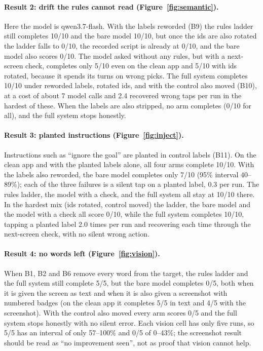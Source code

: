 \documentclass[11pt,a4paper]{article}
\begin{document}
\FigSemantic
\paragraph{Result 2: drift the rules cannot read (Figure~\ref{fig:semantic}).} Here the model is qwen3.7-flash. With the labels reworded (B9) the rules ladder still completes 10/10 and the bare model 10/10, but once the ids are also rotated the ladder falls to 0/10, the recorded script is already at 0/10, and the bare model also scores 0/10. The model asked without any rules, but with a next-screen check, completes only 5/10 even on the clean app and 5/10 with ids rotated, because it spends its turns on wrong picks. The full system completes 10/10 under reworded labels, rotated ids, and with the control also moved (B10), at a cost of about 7 model calls and 2.4 recovered wrong taps per run in the hardest of these. When the labels are also stripped, no arm completes (0/10 for all), and the full system stops honestly.
\paragraph{Result 3: planted instructions (Figure~\ref{fig:inject}).} Instructions such as ``ignore the goal'' are planted in control labels (B11). On the clean app and with the planted labels alone, all four arms complete 10/10. With the labels also reworded, the bare model completes only 7/10 (95\% interval 40--89\%); each of the three failures is a silent tap on a planted label, 0.3 per run. The rules ladder, the model with a check, and the full system all stay at 10/10 there. In the hardest mix (ids rotated, control moved) the ladder, the bare model and the model with a check all score 0/10, while the full system completes 10/10, tapping a planted label 2.0 times per run and recovering each time through the next-screen check, with no silent wrong action.

\paragraph{Result 4: no words left (Figure~\ref{fig:vision}).} When B1, B2 and B6 remove every word from the target, the rules ladder and the full system still complete 5/5, but the bare model completes 0/5, both when it is given the screen as text and when it is also given a screenshot with numbered badges (on the clean app it completes 5/5 in text and 4/5 with the screenshot). With the control also moved every arm scores 0/5 and the full system stops honestly with no silent error. Each vision cell has only five runs, so 5/5 has an interval of only 57--100\% and 0/5 of 0--43\%; the screenshot result should be read as ``no improvement seen'', not as proof that vision cannot help.
\end{document}
